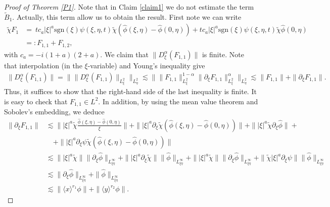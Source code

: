 \documentclass[reqno]{amsart}
\newcommand{\ha}{\hat{\phi}}
\newcommand{\les}{\lesssim}
\newcommand{\lanx}{\langle x \rangle}
\newcommand{\lany}{\langle y \rangle}
\newcommand{\ti}{\tilde {\chi}}
\newcommand{\li}{L^\infty_{\xi \eta}}
\newcommand{\p}{\partial}
\newcommand{\sgn}{\text{sgn}}
\numberwithin{equation}{section}
\begin{document}
\begin{proof}[Proof of Theorem \ref{P1}]
Note that in Claim \ref{claim1} we do not estimate the term $\tilde{B}_1$. Actually, this term allow us to obtain the result. First note we can write
\begin{equation}\label{media0}
\begin{split}
\tilde{\chi}F_1&=\ tc_a|\xi|^a \sgn(\xi)\psi(\xi,\eta,t)\tilde{\chi}(\ha(\xi,\eta)-\ha(0,\eta))+tc_a|\xi|^a \sgn(\xi)\psi(\xi,\eta,t)\tilde{\chi}\ha(0,\eta)  \\
      & =:F_{1,1}+F_{1,2},
\end{split}
\end{equation}with $c_a=-i(1+a)(2+a)$. We claim that $\|D_\xi^{\alpha}(F_{1,1})\|$ is finite. Note that interpolation (in the $\xi$-variable) and Young's inequality give
\begin{equation}\label{kkkk}
\begin{split}
\|D_\xi^{\alpha}(F_{1,1})\|=\| \|D_\xi^{\alpha}(F_{1,1})\|_{L^2_{\xi}}\|_{L^2_{\eta}}
 \lesssim \| \|F_{1,1}\|_{L^2_{\xi}}^{1-\alpha} \|\partial_{\xi}F_{1,1}\|_{L^2_{\xi}}^{\alpha}\|_{L^2_{\eta}}
\lesssim \|F_{1,1}\|+\|\partial_{\xi}F_{1,1}\|.
\end{split}
\end{equation}
Thus, it suffices to show that the right-hand side of the last inequality is finite. It is easy to check that $F_{1,1}\in L^2$. In addition, by using the mean value theorem and Sobolev's embedding, we deduce
\begin{equation*}
\begin{split}
\|\p_\xi F_{1,1}\|&\les \Big \||\xi|^a \ti \frac{\hat \phi (\xi,\eta)-\hat \phi (0,\eta)}{\xi}\Big\|+\||\xi|^a \p_\xi \ti (\hat \phi (\xi,\eta)-\hat \phi (0,\eta))\|+\||\xi|^a \ti \p_\xi \hat \phi\|+\\
&\quad +\||\xi|^a \p_\xi \psi\ti (\hat \phi (\xi,\eta)-\hat \phi (0,\eta))\|\\
&\les  \||\xi|^a \ti\|\|\p_\xi \hat \phi\|_{L^\infty_{\xi \eta}}+\||\xi|^a \p_\xi \ti\|\|\hat \phi\|_{L^\infty_{\xi \eta}}+\||\xi|^a \ti\|\|\p_\xi \hat \phi\|_{L^\infty_{\xi \eta}}+\|\ti|\xi|^a \p_\xi \psi\|\|\ha\|_{\li}\\
&\les \|\p_\xi \hat \phi\|_{L^\infty_{\xi \eta}}+\|\hat \phi\|_{\li}\\
&\les \|\lanx^{r_1}\phi\|+\|\lany^{r_2}\phi\|.
\end{split}
\end{equation*}


\end{proof}
\end{document}
